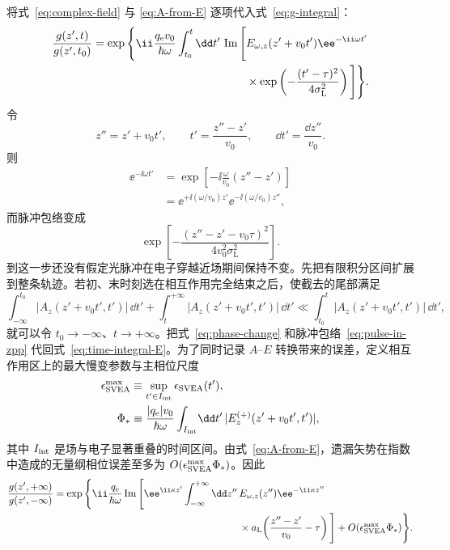 将式~\eqref{eq:complex-field} 与 \eqref{eq:A-from-E} 逐项代入式~\eqref{eq:g-integral}：
\begin{align}
 \frac{g(z',t)}{g(z',t_0)}
 =\exp\Bigg\{\ii\frac{q_{\rm e}v_0}{\hbar\omega}
 \int_{t_0}^{t}\dd t'\,
 \operatorname{Im}\Bigg[
 &E_{\omega,z}(z'+v_0t')\ee^{-\ii\omega t'}\notag\\
 &\times\exp\left(-\frac{(t'-\tau)^2}{4\sigma_{\mathrm L}^2}\right)
 \Bigg]\Bigg\}.
 \label{eq:time-integral-E}
\end{align}
令
\begin{equation}
 z''=z'+v_0t',
 \qquad
 t'=\frac{z''-z'}{v_0},
 \qquad
 \dd t'=\frac{\dd z''}{v_0}.
 \label{eq:zpp-change}
\end{equation}
则
\begin{align}
 \ee^{-\ii\omega t'}
 &=\exp\left[-\ii\frac{\omega}{v_0}(z''-z')\right]\\
 &=\ee^{+\ii(\omega/v_0)z'}
 \ee^{-\ii(\omega/v_0)z''},
 \label{eq:phase-change}
\end{align}
而脉冲包络变成
\begin{equation}
 \exp\left[-\frac{(z''-z'-v_0\tau)^2}{4v_0^2\sigma_{\mathrm L}^2}\right].
 \label{eq:pulse-in-zpp}
\end{equation}
到这一步还没有假定光脉冲在电子穿越近场期间保持不变。先把有限积分区间扩展到整条轨迹。若初、末时刻选在相互作用完全结束之后，使截去的尾部满足
\begin{equation}
 \boxed{
 \int_{-\infty}^{t_0}\!|A_z(z'+v_0t',t')|\,\dd t'
 +\int_t^{+\infty}\!|A_z(z'+v_0t',t')|\,\dd t'
 \ll
 \int_{t_0}^{t}\!|A_z(z'+v_0t',t')|\,\dd t',}
 \label{eq:infinite-limit-condition}
\end{equation}
就可以令 $t_0\to-\infty$、$t\to+\infty$。把式~\eqref{eq:phase-change} 和脉冲包络~\eqref{eq:pulse-in-zpp} 代回式~\eqref{eq:time-integral-E}。为了同时记录 $A$--$E$ 转换带来的误差，定义相互作用区上的最大慢变参数与主相位尺度
\begin{align}
\epsilon_{\rm SVEA}^{\max}
&\equiv \sup_{t'\in I_{\rm int}}\epsilon_{\rm SVEA}(t'),\\
\Phi_*
&\equiv
\frac{|q_{\rm e}|v_0}{\hbar\omega}
\int_{I_{\rm int}}\!\dd t'\,
|E_z^{(+)}(z'+v_0t',t')|,
\label{eq:pulse-phase-error-scale}
\end{align}
其中 $I_{\rm int}$ 是场与电子显著重叠的时间区间。由式~\eqref{eq:A-from-E}，遗漏矢势在指数中造成的无量纲相位误差至多为 $O(\epsilon_{\rm SVEA}^{\max}\Phi_*)$。因此
\begin{align}
\frac{g(z',+\infty)}{g(z',-\infty)}
=\exp\Bigg\{
\ii\frac{q_{\rm e}}{\hbar\omega}
\operatorname{Im}\Bigg[
\ee^{\ii\kappa z'}
\int_{-\infty}^{+\infty}\dd z''\,
&E_{\omega,z}(z'')\ee^{-\ii\kappa z''}\\
&\times
 a_{\rm L}\!\left(\frac{z''-z'}{v_0}-\tau\right)
\Bigg]
+O(\epsilon_{\rm SVEA}^{\max}\Phi_*)
\Bigg\}.
\label{eq:pulse-phase-before-freeze}
\end{align}
